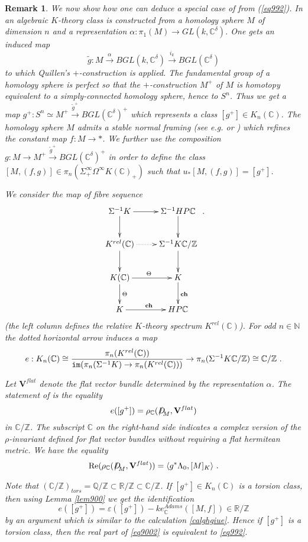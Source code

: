\documentclass[12pt]{article}
\newtheorem{rem}[theorem]{Remark}
\newcommand{\Ree}{\mathrm{Re}}
\newcommand{\im}{{\tt im}}
\newcommand{\nat}{{\mathbb{N}}}
\newcommand{\Z}{{\mathbb{Z}}}
\newcommand{\Q}{{\mathbb{Q}}}
\newcommand{\R}{{\mathbb{R}}}
\newcommand{\C}{{\mathbb{C}}}
\newcommand{\ch}{{\mathbf{ch}}}
\newcommand{\bV}{{\mathbf{V}}}
\newcommand{\Dirac}{{D\hspace{-0.27cm}/}}
\begin{document}
 
 \begin{rem}{\rm
We now show how one can deduce a special case of  \cite[Thm A]{westburyjones} from
 (\ref{eq992}). In \cite{westburyjones} an algebraic $K$-theory class is constructed from
 a homology sphere $M$ of dimension $n$ and a representation
 $\alpha:\pi_{1}(M)\to GL(k,\C^{\delta})$. 
 One  gets an induced map 
 $$\tilde g:M\stackrel{\alpha}{\to} BGL(k,\C^{\delta})\stackrel{i_{k}}{\to} BGL(\C^{\delta})$$ to which Quillen's $+$-construction is applied. The fundamental group of a homology sphere is perfect so that  the $+$-construction
 $M^{+}$ of $M$ is homotopy equivalent to a simply-connected homology sphere, hence to $S^{n}$.
 Thus we get a map
 $g^{+}: S^{n}\simeq M^{+} \stackrel{\tilde g^{+}}{\to}  BGL(\C^{\delta})^{+}$ which represents a class
 $[g^{+}]\in K_{n}(\C)$. The homology sphere $M$  admits a stable normal framing (see e.g. \cite{MR0148075} or \cite[Lem. 1]{MR0287549}) which refines the constant map $f:M\to *$.
 We further use  the composition
  $g:M\to M^{+}\stackrel{\tilde g^{+}}{\to}  BGL(\C^{\delta})^{+}$ in order to define  the class
 $[M,(f,g)]\in \pi_{n}(\Sigma^{\infty}_{+}\Omega^{\infty}K(\C)_{+})$ such that $u_{*}[M,(f,g)]=[g^{+}]$.

We consider the map of fibre sequence
$$\xymatrix{\Sigma^{-1}K\ar[r]\ar[d]&\Sigma^{-1}HP\C\ar[d]\\K^{rel}(\C)\ar[d]\ar@{.>}[r]&\Sigma^{-1}K\C/\Z\ar[d]\\
K(\C)\ar[r]^{\Theta}\ar[d]^{\Theta}&K\ar[d]^{\ch}\\
K\ar[r]^{\ch}&HP\C}\ .$$
 (the left column defines the relative $K$-theory spectrum $K^{rel}(\C)$). For odd $n\in \nat$ the dotted horizontal arrow
induces a map
\begin{equation}\label{eq9001}e:K_{n}(\C)\cong \frac{\pi_{n}(K^{rel}(\C))}{\im(\pi_{n}(\Sigma^{-1}K)\to \pi_{n}(K^{rel}(\C)))}\to \pi_{n}(\Sigma^{-1} K\C/\Z)\cong \C/\Z\ .\end{equation}




Let $\bV^{flat}$ denote the flat vector bundle determined by the representation $\alpha$.
The statement of  \cite[Thm A]{westburyjones} is the equality
\begin{equation}\label{eq9002}e([g^{+}])=\rho_{\C}(\Dirac_{M},\bV^{flat})\end{equation}
in $\C/\Z$. The subscript $\C$ on the right-hand side indicates  a complex version of the $\rho$-invariant defined for flat vector bundles without requiring a flat hermitean metric.
We have the equality
 $$\Ree(\rho_{\C}(\Dirac_{M},\bV^{flat}))=\langle g^{*}\Lambda_{0},[M]_{K} \rangle\ .$$
  
 Note that $(\C/\Z)_{tors}=\Q/\Z\subset \R/\Z\subset \C/\Z$.
If $[g^{+}]\in K_{n}(\C)$ is a torsion class, then using Lemma \ref{lem900}  we get the identification
$$e([g^{+}])=\varepsilon([g^{+}])-k e_{\C}^{Adams}([M,f])\in \R/\Z$$ by an argument which is similar to the calculation   \eqref{calghgiue}. 
Hence if $[g^{+}]$ is a torsion class, then the real part of \eqref{eq9002} is equivalent to \eqref{eq992}.
 
  }\end{rem}
\end{document}
